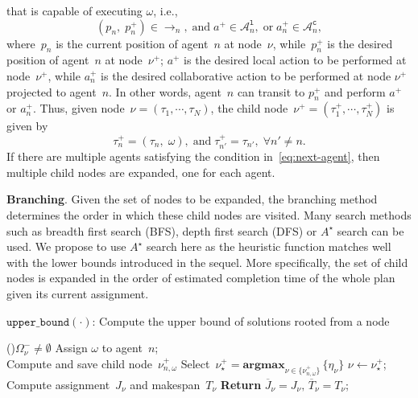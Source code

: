 that is capable of executing $\omega$, i.e.,
\begin{equation}\label{eq:next-agent}
(p_n,\;p_n^+) \in \rightarrow_n,\;\text{and} \; a^+ \in \mathcal{A}^{\texttt{l}}_{n},
\;\text{or}\;a_n^+ \in \mathcal{A}^{\texttt{c}}_{n},
\end{equation}
where~$p_n$ is the current position of agent~$n$ at node~$\nu$,
while~$p^+_n$ is the desired position of agent~$n$ at node~$\nu^+$;
$a^+$ is the desired local action to be performed at node~$\nu^+$,
while $a^+_n$ is the desired collaborative action to be performed
at node $\nu^+$ projected to agent~$n$.
In other words, agent~$n$ can transit to $p^+_n$ and perform $a^+$ or $a_n^+$.
Thus, given node~$\nu=(\tau_1,\cdots,\tau_N)$,
the child node~$\nu^+=(\tau^+_1,\cdots,\tau^+_N)$ is given by
\begin{equation}\label{eq:next-node}
\tau_n^+ = (\tau_n,\;\omega),\;\text{and}\;
\tau_{n'}^+=\tau_{n'},\; \forall n'\neq n.
\end{equation}
If there are multiple agents satisfying the condition in~\eqref{eq:next-agent},
then multiple child nodes are expanded, one for each agent.

\textbf{Branching}.
Given the set of nodes to be expanded,
the branching method determines the order in which these child nodes are
visited.
Many search methods such as breadth first search (BFS), depth first search (DFS)
or $A^\star$ search can be used.
We propose to use $A^\star$ search here as the heuristic function matches well
with the lower bounds introduced in the sequel.
More specifically, the set of child nodes is expanded in the order of
estimated completion time of the whole plan given its current assignment.

\begin{algorithm}[t]
\caption{$\texttt{upper\_bound}(\cdot)$: Compute the upper bound of solutions
rooted from a node}
\label{alg:upper_bound}
\While(\tcp*[f]{\eqref{eq:node-tasks}}){$\Omega^-_\nu \neq \emptyset$}{
{Assign $\omega$ to agent~$n$;\\
Compute and save child node~$\nu_{n,\omega}^+$\tcp*{\eqref{eq:next-node}}}
Select~$\nu^{+}_{\star}=\textbf{argmax}_{\nu\in \{\nu_{n,\omega}^+\}}\,\{\eta_{\nu}\}$
\label{algline:compute-eta}\tcp*{\eqref{eq:node-makespan}}
$\nu \leftarrow \nu^{+}_{\star}$; \label{algline:expand-node}\\
}
Compute assignment~$J_\nu$ and makespan~$T_\nu$
\label{algline:return}\tcp*{\eqref{eq:complete-assignment}}
\textbf{Return} $\overline{J}_\nu=J_\nu,\, \overline{T}_\nu=T_\nu$;\\
\end{algorithm}

